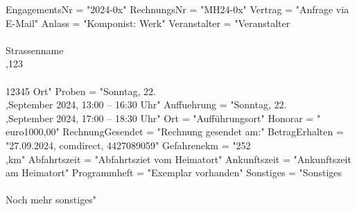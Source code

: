 \documentclass[11pt,a4paper,DIV=10]{scrartcl}
\begin{document}
\begin{luacode}
    EngagementsNr = "2024-0x"
    RechnungsNr = "MH24-0x"
    Vertrag = "Anfrage via E-Mail"
    Anlass = "Komponist: Werk"
    Veranstalter = "Veranstalter\\\\Strassenname\\,123\\\\12345 Ort"
    Proben = "Sonntag, 22.\\,September 2024, 13:00 -- 16:30 Uhr"
    Auffuehrung = "Sonntag, 22.\\,September 2024, 17:00 -- 18:30 Uhr"
    Ort = "Aufführungsort"
    Honorar = "\\euro{1000,00}"
    RechnungGesendet = "Rechnung gesendet am:"
    BetragErhalten = "27.09.2024, comdirect, 4427089059"
    Gefahrenekm = "252\\,km"
    Abfahrtszeit = "Abfahrtsziet vom Heimatort"
    Ankunftszeit = "Ankunftszeit am Heimatort"
    Programmheft = "Exemplar vorhanden"
    Sonstiges = "Sonstiges\\\\Noch mehr sonstiges"
\end{luacode}
\end{document}
